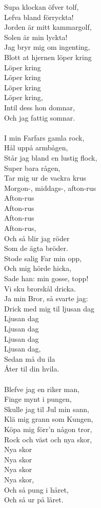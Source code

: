 \vspace{10pt}
Supa klockan öfver tolf,\\
Lefva bland förryckta!\\
Jorden är mitt kammargolf,\\
Solen är min lyckta!\\
Jag bryr mig om ingenting,\\
Blott at hjernen löper kring \\
	Löper kring\\
	Löper kring\\
	Löper kring\\
	Löper kring,\\
Intil dess hon domnar,\\
Och jag fattig somnar.\\
	 \\
I min Farfars gamla rock,\\
Hål uppå armbågen,\\
Står jag bland en lustig flock,\\
Super bara rågen,\\
Tar mig ur de vackra krus\\
Morgon-, middags-, afton-rus\\
	 Afton-rus\\
	 Afton-rus\\
	 Afton-rus\\
	 Afton-rus,\\
Och så blir jag röder\\
Som de ägta bröder.\\

Stode salig Far min opp,\\
Och mig hörde hicka,\\
Sade han: min gosse, topp!\\
Vi sku brorskål dricka.\\
Ja min Bror, så svarte jag:\\
Drick med mig til ljusan dag\\
	 Ljusan dag\\
	 Ljusan dag\\
	 Ljusan dag\\
	 Ljusan dag,\\
Sedan må du ila\\
Åter til din hvila.\\
\\

Blefve jag en riker man,\\
Finge mynt i pungen,\\
Skulle jag til Jul min sann,\\
Klä mig grann som Kungen,\\
Köpa mig förr'n någon tror,\\
Rock och väst och nya skor,\\
	 Nya skor\\
	 Nya skor\\
	 Nya skor\\
	 Nya skor,\\
Och så pung i håret,\\
Och så ur på låret.\\
	 \\

